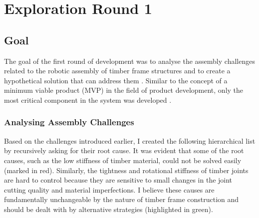 \chapter{Exploration Round 1}
\label{chapter:exploration-round-1}

\section{Goal}
\label{section:exploration-1-goal}

The goal of the first round of development was to analyse the assembly challenges related to the robotic assembly of timber frame structures and to create a hypothetical solution that can address them . Similar to the concept of a minimum viable product (MVP) in the field of product development, only the most critical component in the system was developed .
\subsection{Analysing Assembly Challenges}
\label{subsection:exploration-1-analysing-assembly-challenges}

Based on the challenges introduced earlier, I created the following hierarchical list by recursively asking for their root cause. It was evident that some of the root causes, such as the low stiffness of timber material, could not be solved easily (marked in red). Similarly, the tightness and rotational stiffness of timber joints are hard to control because they are sensitive to small changes in the joint cutting quality and material imperfections. I believe these causes are fundamentally unchangeable by the nature of timber frame construction and should be dealt with by alternative strategies (highlighted in green). 

